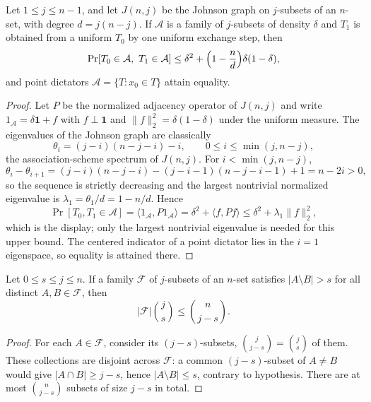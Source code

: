 \begin{proposition}\label{prop:v13-johnson-exchange}
Let $1\le j\le n-1$, and let $J(n,j)$ be the Johnson graph on $j$-subsets of an $n$-set, with degree $d=j(n-j)$.  If $\mathcal A$ is a family of $j$-subsets of density $\delta$ and $T_1$ is obtained from a uniform $T_0$ by one uniform exchange step, then
\[
        \Pr[T_0\in\mathcal A,\ T_1\in\mathcal A]
        \le
        \delta^2+\Bigl(1-\frac{n}{d}\Bigr)\delta(1-\delta),
\]
and point dictators $\mathcal A=\{T:x_0\in T\}$ attain equality.
\end{proposition}

\begin{proof}
Let $P$ be the normalized adjacency operator of $J(n,j)$ and write $1_{\mathcal A}=\delta\mathbf 1+f$ with $f\perp\mathbf1$ and $\|f\|_2^2=\delta(1-\delta)$ under the uniform measure.  The eigenvalues of the Johnson graph are classically
\[
        \theta_i=(j-i)(n-j-i)-i,
        \qquad 0\le i\le \min(j,n-j),
\]
the association-scheme spectrum of $J(n,j)$.  For $i<\min(j,n-j)$,
\[
        \theta_i-\theta_{i+1}
        =(j-i)(n-j-i)-(j-i-1)(n-j-i-1)+1
        =n-2i>0,
\]
so the sequence is strictly decreasing and the largest nontrivial normalized eigenvalue is $\lambda_1=\theta_1/d=1-n/d$.  Hence
\[
        \Pr[T_0,T_1\in\mathcal A]
        =\langle1_{\mathcal A},P1_{\mathcal A}\rangle
        =\delta^2+\langle f,Pf\rangle
        \le\delta^2+\lambda_1\|f\|_2^2 ,
\]
which is the display; only the largest nontrivial eigenvalue is needed for this upper bound.  The centered indicator of a point dictator lies in the $i=1$ eigenspace, so equality is attained there.
\end{proof}

\begin{proposition}\label{prop:v13-anticode}
Let $0\le s\le j\le n$.  If a family $\mathcal F$ of $j$-subsets of an $n$-set satisfies $|A\setminus B|>s$ for all distinct $A,B\in\mathcal F$, then
\[
        |\mathcal F|\binom js\le \binom n{j-s}.
\]
\end{proposition}

\begin{proof}
For each $A\in\mathcal F$, consider its $(j-s)$-subsets, $\binom j{j-s}=\binom js$ of them.  These collections are disjoint across $\mathcal F$: a common $(j-s)$-subset of $A\ne B$ would give $|A\cap B|\ge j-s$, hence $|A\setminus B|\le s$, contrary to hypothesis.  There are at most $\binom n{j-s}$ subsets of size $j-s$ in total.
\end{proof}

